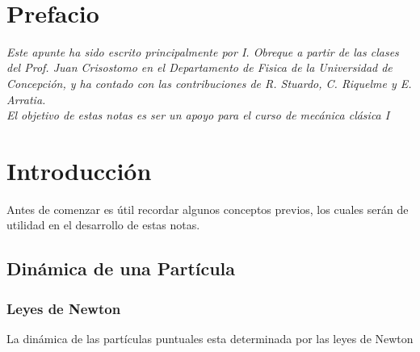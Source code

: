 \documentclass[12pt]{report}
\begin{document}
\newpage
\thispagestyle{empty}
\ \\
\newpage
\setcounter{page}{1}


\pagestyle{plain}
\chapter*{Prefacio}

\textit{Este apunte ha sido escrito principalmente por I. Obreque a partir de las clases del Prof. Juan Crisostomo en el Departamento de Fisica de la Universidad de Concepción, y ha contado con las contribuciones de R. Stuardo, C. Riquelme y E. Arratia.} \\

\textit{El objetivo de estas notas es ser un apoyo para el curso de mecánica clásica I } 
\bigskip
\bigskip
\bigskip
\bigskip
\bigskip
\bigskip


\newpage



\thispagestyle{empty}
\tableofcontents
\listoffigures

\newpage
 
\setcounter{page}{1}

\chapter{Introducci\'on}\label{chapter1}

Antes de comenzar es útil recordar algunos conceptos previos, los cuales serán de utilidad en el desarrollo de estas notas. 

\section{Dinámica de una Partícula}
\subsection{Leyes de Newton}

La dinámica de las partículas puntuales esta determinada por las leyes de Newton
\end{document}
